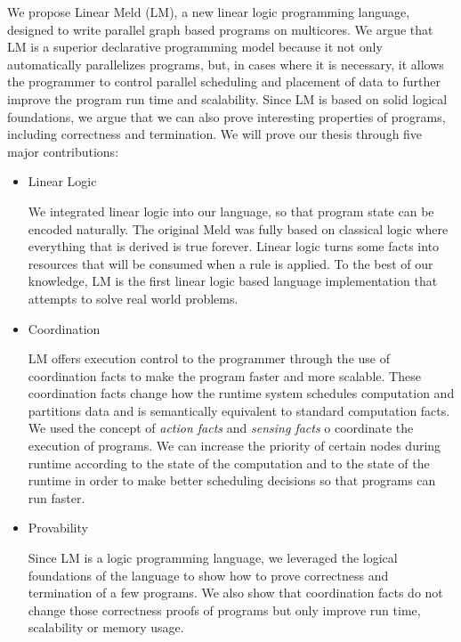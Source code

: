 
We propose Linear Meld (LM), a new linear logic programming language, designed
to write parallel graph based programs on multicores.  We argue that LM is a
superior declarative programming model because it not only automatically
parallelizes programs, but, in cases where it is necessary, it allows the
programmer to control parallel scheduling and placement of data to further
improve the program run time and scalability.  Since LM is based on solid
logical foundations, we argue that we can also prove interesting properties of
programs, including correctness and termination. We will prove our thesis
through five major contributions:

\begin{itemize}
   
   \item Linear Logic

   We integrated linear logic into our language, so that program state can be
   encoded naturally. The original Meld was fully based on classical logic where
   everything that is derived is true forever. Linear logic turns some facts
   into resources that will be consumed when a rule is applied.  To the best of
   our knowledge, LM is the first linear logic based language implementation
   that attempts to solve real world problems.


   \item Coordination
   
   LM offers execution control to the programmer through the use of coordination
   facts to make the program faster and more scalable. These coordination facts
   change how the runtime system schedules computation and partitions data and
   is semantically equivalent to standard computation facts.  We used the
   concept of \emph{action facts} and \emph{sensing facts} o coordinate the
   execution of programs.  We can increase the priority of certain nodes during
   runtime according to the state of the computation and to the state of the
   runtime in order to make better scheduling decisions so that programs can run
   faster.
   
   \item Provability
   
   Since LM is a logic programming language, we leveraged the logical
   foundations of the language to show how to prove correctness and termination of a few
   programs. We also show that coordination facts do not change those
   correctness proofs of programs but only improve run time, scalability or
   memory usage.


\end{itemize}
